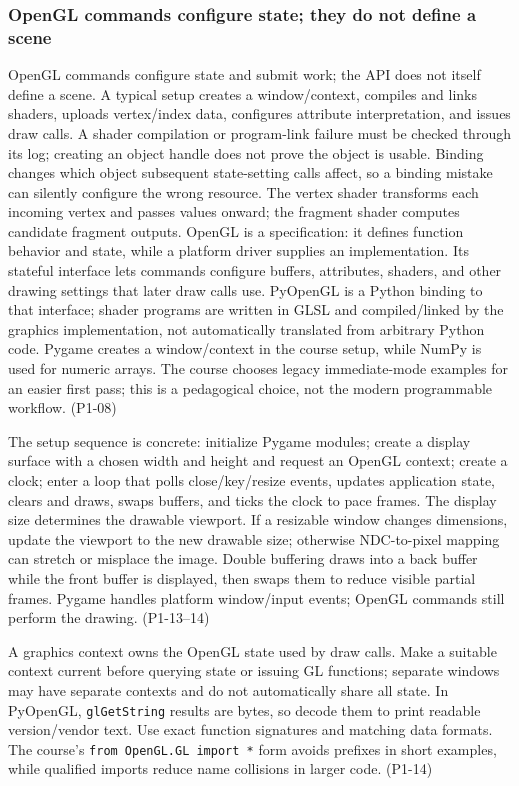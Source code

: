 \subsubsection{OpenGL commands configure state; they do not define a scene}\label{03-visual-computing-i-ch018-opengl-commands-configure-state-they-do-not-define-a-scene}

OpenGL commands configure state and submit work; the API does not itself define a scene. A typical setup creates a window/context, compiles and links shaders, uploads vertex/index data, configures attribute interpretation, and issues draw calls. A shader compilation or program-link failure must be checked through its log; creating an object handle does not prove the object is usable. Binding changes which object subsequent state-setting calls affect, so a binding mistake can silently configure the wrong resource. The vertex shader transforms each incoming vertex and passes values onward; the fragment shader computes candidate fragment outputs. OpenGL is a specification: it defines function behavior and state, while a platform driver supplies an implementation. Its stateful interface lets commands configure buffers, attributes, shaders, and other drawing settings that later draw calls use. PyOpenGL is a Python binding to that interface; shader programs are written in GLSL and compiled/linked by the graphics implementation, not automatically translated from arbitrary Python code. Pygame creates a window/context in the course setup, while NumPy is used for numeric arrays. The course chooses legacy immediate-mode examples for an easier first pass; this is a pedagogical choice, not the modern programmable workflow. (P1-08)

The setup sequence is concrete: initialize Pygame modules; create a display surface with a chosen width and height and request an OpenGL context; create a clock; enter a loop that polls close/key/resize events, updates application state, clears and draws, swaps buffers, and ticks the clock to pace frames. The display size determines the drawable viewport. If a resizable window changes dimensions, update the viewport to the new drawable size; otherwise NDC-to-pixel mapping can stretch or misplace the image. Double buffering draws into a back buffer while the front buffer is displayed, then swaps them to reduce visible partial frames. Pygame handles platform window/input events; OpenGL commands still perform the drawing. (P1-13--14)

A graphics context owns the OpenGL state used by draw calls. Make a suitable context current before querying state or issuing GL functions; separate windows may have separate contexts and do not automatically share all state. In PyOpenGL, \texttt{glGetString} results are bytes, so decode them to print readable version/vendor text. Use exact function signatures and matching data formats. The course's \texttt{from\ OpenGL.GL\ import\ *} form avoids prefixes in short examples, while qualified imports reduce name collisions in larger code. (P1-14)

